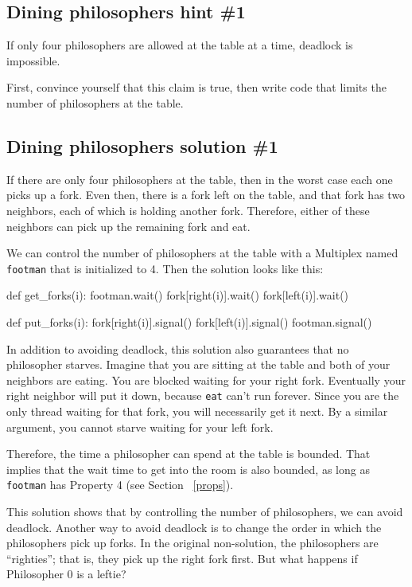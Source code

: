 \documentclass{book}
\begin{document}
\subsection{Dining philosophers hint \#1}

If only four philosophers are allowed at the table at a time,
deadlock is impossible.

First, convince yourself that this claim is true, then write code that
limits the number of philosophers at the table.



\subsection{Dining philosophers solution \#1}

If there are only four philosophers at the table, then in the
worst case each one picks up a fork.  Even then, there is a fork
left on the table, and that fork has two neighbors, each of
which is holding another fork.  Therefore, either of these
neighbors can pick up the remaining fork and eat.

We can control the number of philosophers at the table with
a Multiplex named {\tt footman} that is initialized to 4.
Then the solution looks like this:


\begin{unbreakable}[title={Dining philosophers solution \#1}]{}
def get_forks(i):
    footman.wait()
    fork[right(i)].wait()
    fork[left(i)].wait()

def put_forks(i):
    fork[right(i)].signal()
    fork[left(i)].signal()
    footman.signal()
\end{unbreakable}

In addition to avoiding deadlock, this solution also guarantees that
no philosopher starves.
Imagine that you
are sitting at the table and both of your neighbors are eating.  You
are blocked waiting for your right fork.  Eventually your right
neighbor will put it down, because {\tt eat} can't run forever.  Since
you are the only thread waiting for that fork, you will necessarily
get it next.  By a similar argument, you cannot starve waiting for
your left fork.

Therefore, the time a philosopher can spend at the table is bounded.
That implies that the wait time to get into the room is also bounded,
as long as {\tt footman} has Property 4 (see Section ~\ref{props}).

This solution shows that
by controlling the number of philosophers, we can avoid deadlock.
Another way to avoid deadlock is to change the order in which the
philosophers pick up forks.  In the original non-solution, the
philosophers are ``righties''; that is, they pick up the right fork
first.  But what happens if Philosopher 0 is a leftie?
\end{document}
